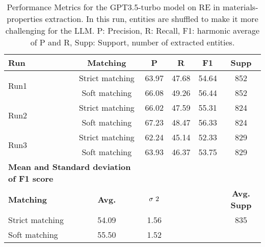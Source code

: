 \begin{table}[htbp]
    \small
    \centering
    \caption{Performance Metrics for the GPT3.5-turbo model on RE in materials-properties extraction. In this run, entities are shuffled to make it more challenging for the LLM. P: Precision, R: Recall, F1: harmonic average of P and R, Supp: Support, number of extracted entities.}
    \begin{tabular}{lccccc}
        \toprule
        \textbf{Run} & \textbf{Matching} & \textbf{P} & \textbf{R} & \textbf{F1} & \textbf{Supp} \\
        \midrule
        \multirow{2}{*}{Run1} & Strict matching & 63.97 & 47.68 & 54.64 & 852 \\
        & Soft matching & 66.08 & 49.26 & 56.44 & 852 \\
        \midrule
        \multirow{2}{*}{Run2} & Strict matching & 66.02 & 47.59 & 55.31 & 824 \\
        & Soft matching & 67.23 & 48.47 & 56.33 & 824 \\
        \midrule
        \multirow{2}{*}{Run3} & Strict matching & 62.24 & 45.14 & 52.33 & 829 \\
        & Soft matching & 63.93 & 46.37 & 53.75 & 829 \\
        \midrule
        \multicolumn{2}{l}{\textbf{Mean and Standard deviation of F1 score}} & & & & \\
        \midrule
        \textbf{Matching} & \textbf{Avg.} & $\sigma\textsuperscript{2}$ & & & \textbf{Avg. Supp}\\
        Strict matching & 54.09 & 1.56 & & & 835 \\
        Soft matching   & 55.50 & 1.52 & & \\
        \bottomrule
    \end{tabular}
\end{table}

